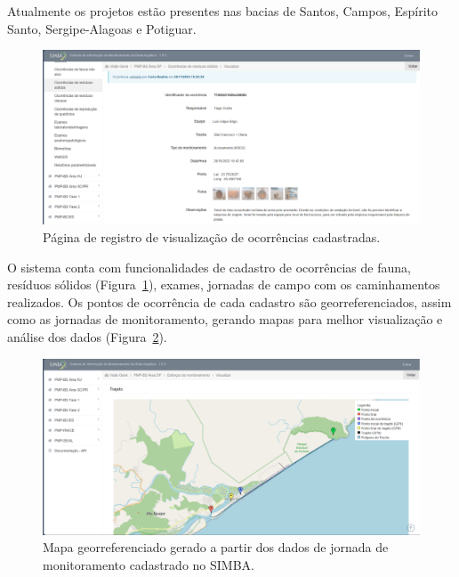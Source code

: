 Atualmente os projetos estão presentes nas bacias de Santos, Campos, Espírito Santo, Sergipe-Alagoas e Potiguar.

\begin{figure}[htb]
  \centering
  \includegraphics[width=1\textwidth]{imagens/simbaRegistro.png}
  \caption{Página de registro de visualização de ocorrências cadastradas.}
  \label{fig:simbaRegistro}
\end{figure}

O sistema conta com funcionalidades de cadastro de ocorrências de fauna, resíduos sólidos (Figura~\ref{fig:simbaRegistro}), exames, jornadas de campo com os caminhamentos realizados. Os pontos de ocorrência de cada cadastro são georreferenciados, assim como as jornadas de monitoramento, gerando mapas para melhor visualização e análise dos dados (Figura~\ref{fig:simbaMonitoramento}).

\begin{figure}[htb]
  \centering
  \includegraphics[width=1\textwidth]{imagens/simbaTrajetoria.png}
  \caption{Mapa georreferenciado gerado a partir dos dados de jornada de monitoramento cadastrado no SIMBA.}
  \label{fig:simbaMonitoramento}
\end{figure}

